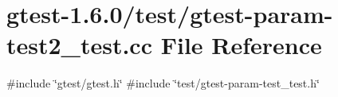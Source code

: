 \hypertarget{gtest-param-test2__test_8cc}{\section{gtest-\/1.6.0/test/gtest-\/param-\/test2\-\_\-test.cc \-File \-Reference}
\label{d1/d1a/gtest-param-test2__test_8cc}
}
{\ttfamily \#include \char`\"{}gtest/gtest.\-h\char`\"{}}\*
{\ttfamily \#include \char`\"{}test/gtest-\/param-\/test\-\_\-test.\-h\char`\"{}}\*
